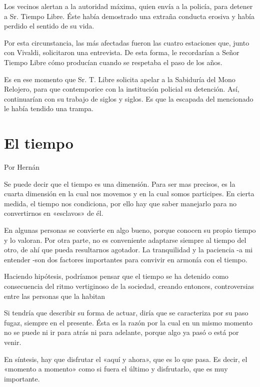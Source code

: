 \documentclass[11pt,twoside,openright,a5paper]{book}
\begin{document}
Los vecinos alertan a la autoridad máxima, quien envía a la policía, para detener a Sr. Tiempo Libre. Éste había demostrado una extraña conducta erosiva y había perdido el sentido de su vida.

Por esta circunstancia, las más afectadas fueron las cuatro estaciones que, junto con Vivaldi, solicitaron una entrevista. De esta forma, le recordarían a Señor Tiempo Libre cómo producían cuando se respetaba el paso de los años.

Es en ese momento que Sr. T. Libre solicita apelar a la Sabiduría del Mono Relojero, para que contemporice con la institución policial su detención. Así, continuarían con su trabajo de siglos y siglos. Es que la escapada del mencionado le había tendido una trampa.
\clearpage
\section*{El tiempo}
                                                                                                \begin{flushright}Por Hernán\end{flushright}

Se puede decir que el tiempo es una dimensión. Para ser mas precisos, es la cuarta dimensión  en la cual nos movemos y en la cual somos participes. En cierta medida, el tiempo nos condiciona, por ello hay que saber manejarlo para no convertirnos en «esclavos» de él.  

En algunas personas se convierte en algo bueno, porque conocen su propio tiempo y lo valoran. Por otra parte, no es conveniente adaptarse siempre  al tiempo del otro, de ahí que pueda resultarnos agotador. La tranquilidad y la paciencia -a mi entender -son dos factores importantes para convivir en armonía con el tiempo.

Haciendo hipótesis, podríamos pensar que el tiempo se ha detenido como consecuencia del ritmo vertiginoso de la sociedad, creando entonces, controversias entre las personas que la habitan

Si tendría que describir su forma de actuar, diría que se caracteriza por su paso fugaz, siempre  en el presente. Ésta es la razón por la cual en un mismo momento no se puede ni ir para atrás ni para adelante, porque algo ya pasó o está por venir. 

En síntesis, hay que disfrutar el «aquí y ahora», que es lo que pasa. Es decir, el «momento a momento» como si fuera el último y disfrutarlo, que es muy importante.
\end{document}
